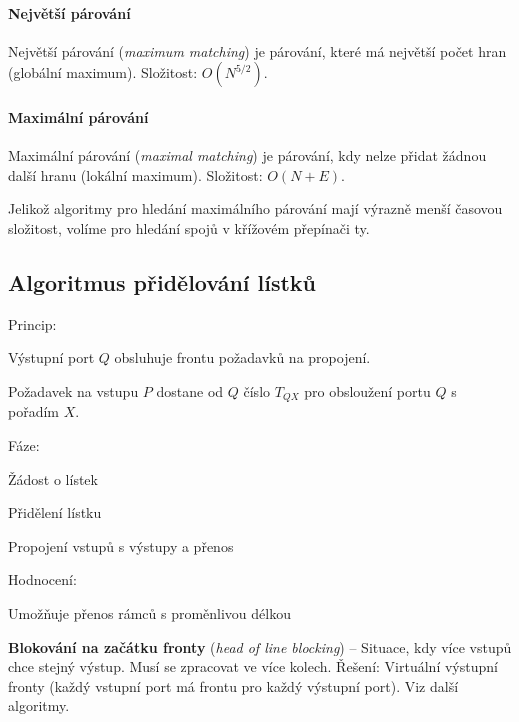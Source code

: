 \paragraph*{Největší párování} Největší párování (\textit{maximum matching}) je párování, které má největší počet hran (globální maximum). Složitost: $O(N^{5/2})$.

\paragraph*{Maximální párování} Maximální párování (\textit{maximal matching}) je párování, kdy nelze přidat žádnou další hranu (lokální maximum). Složitost: $O(N+E)$.

\bigskip\noindent Jelikož algoritmy pro hledání maximálního párování mají výrazně menší časovou složitost, volíme pro hledání spojů v křížovém přepínači ty.

\subsection{Algoritmus přidělování lístků}

\begin{compactitem}
    \item Princip: \begin{compactitem}
        \item Výstupní port $Q$ obsluhuje frontu požadavků na propojení.
        \item Požadavek na vstupu $P$ dostane od $Q$ číslo $T_{QX}$ pro obsloužení portu $Q$ s pořadím $X$.
    \end{compactitem}
    \item Fáze: \begin{compactenum}
        \item Žádost o lístek
        \item Přidělení lístku
        \item Propojení vstupů s výstupy a přenos
    \end{compactenum}
    \item Hodnocení: \begin{compactitem}
        \item Umožňuje přenos rámců s proměnlivou délkou
        \item \textbf{Blokování na začátku fronty} (\textit{head of line blocking}) -- Situace, kdy více vstupů chce stejný výstup. Musí se zpracovat ve více kolech. Řešení: Virtuální výstupní fronty (každý vstupní port má frontu pro každý výstupní port). Viz další algoritmy.
    \end{compactitem}
\end{compactitem}

